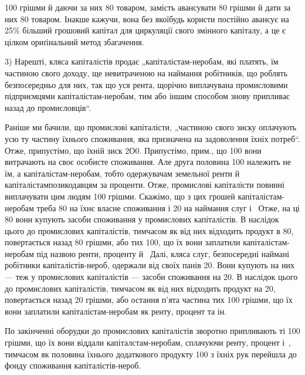 \parcont{}  %
100 грішми й даючи за них 80 товаром, замість авансувати 80 грішми й
дати за них 80 товаром. Інакше кажучи, вона без якоїбудь користи постійно авансує на 25\%
більший грошовий капітал для циркуляції свого змінного капіталу, а це є цілком ориґінальний метод
збагачення.

3) Нарешті, кляса капіталістів продає „капіталістам-неробам, які платять, їм частиною свого доходу,
ще невитраченою на наймання робітників, що роблять безпосередньо для них, так що уся рента, щорічно
виплачувана промисловими підприємцями капіталістам-неробам, тим або іншим способом знову припливає
назад до промисловців“.

Раніше ми бачили, що промислові капіталісти, „частиною свого зиску оплачують усю ту частину їхнього
споживання, яка призначена на задоволення їхніх потреб“. Отже, припустімо, що їхній зиск \deq{} 2О0. Припустімо, прим., що 100 вони витрачають на своє особисте споживання. Але друга
половина \deq{} 100 належить не їм, а капіталістам-неробам, тобто одержувачам земельної ренти й
капіталістампозикодавцям
за проценти. Отже, промислові капіталісти повинні виплачувати цим людям 100 грішми.
Скажімо, що з цих грошей капіталістам-неробам треба 80 на їхнє власне споживання і 20 на наймання слуг і~ Отже, на ці 80 вони купують засоби споживання у
промислових капіталістів. В наслідок цього до промислових капіталістів, тимчасом як від них
відходить продукт в 80, повертається назад 80 грішми, або  тих 100,
що їх вони заплатили капіталістам-неробам під назвою ренти, проценту й~ Далі, кляса слуг,
безпосередні наймані робітники капіталістів-нероб, одержали від своїх панів 20. Вони
купують на них — теж у промислових капіталістів — засоби споживання на 20. В наслідок цього
до промислових капіталістів, тимчасом як від них відходить продукт на 20, повертається
назад 20 грішми, або остання п’ята частина тих 100 грішми, що їх вони заплатили
капіталістам-неробам як ренту, процент та ін.

По закінченні оборудки до промислових капіталістів зворотно припливають ті 100 грішми, що
їх вони віддали капіталстам-неробам, сплачуючи ренту, процент і~, тимчасом як половина їхнього
додаткового продукту \deq{} 100 з їхніх рук перейшла до фонду споживання капіталістів-нероб.

